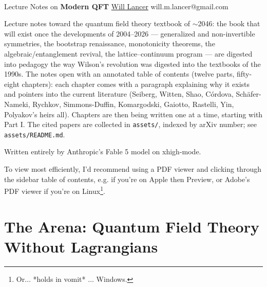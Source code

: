 \documentclass[11pt]{article}
\numberwithin{equation}{section}
\renewcommand{\theHsection}{part.\arabic{part}.section.\arabic{section}}
\renewcommand{\theHequation}{\theHsection.equation.\arabic{equation}}
\theoremstyle{definition}
\begin{document}
\thispagestyle{empty}
\bigskip \
\vspace{0.1cm}

\begin{center}
{\fontsize{22}{22} \selectfont Lecture Notes on}
\vskip 16pt
{\fontsize{36}{36} \selectfont \bf \sffamily Modern QFT}
\vskip 24pt
{\fontsize{18}{18} \selectfont \rmfamily \href{https://will-lancer.github.io}{Will Lancer}}
\vskip 6pt
{\fontsize{14}{14} \selectfont \ttfamily will.m.lancer@gmail.com}
\vskip 24pt
\end{center}

{\parindent0pt \baselineskip=15.5pt}
\noin
Lecture notes toward the quantum field theory textbook of $\sim$2046: the book 
that will exist once the developments of 2004--2026 --- generalized and 
non-invertible symmetries, the bootstrap renaissance, monotonicity theorems, the 
algebraic/entanglement revival, the lattice--continuum program --- are digested 
into pedagogy the way Wilson's revolution was digested into the textbooks of the 
1990s. The notes open with an annotated table of contents (twelve parts,
fifty-eight chapters): each chapter comes with a paragraph explaining why it
exists and pointers into the current literature (Seiberg, Witten, Shao, 
C\'ordova, Sch\"afer-Nameki, Rychkov, Simmons-Duffin, Komargodski, Gaiotto, 
Rastelli, Yin, Polyakov's heirs all). Chapters are then being written one at a 
time, starting with Part I. The cited papers are collected in \texttt{assets/}, 
indexed by arXiv number; see \texttt{assets/README.md}.\\

\begin{center}
    Written entirely by Anthropic's Fable 5 model on xhigh-mode.
\end{center}

To view most efficiently, I'd recommend using a PDF viewer and clicking
through the sidebar table of contents, e.g. if you're on Apple then
Preview, or Adobe's PDF viewer if you're on Linux\footnote{Or$\ldots$ *holds in vomit* $\ldots$ Windows.}.
\newpage
\microtoc
\newpage



\newpage

\part{The Arena: Quantum Field Theory Without Lagrangians}


\newpage


\clearpage
\appendix
\renewcommand{\theHsection}{appendix.section.\arabic{section}}
\renewcommand{\theHequation}{\theHsection.equation.\arabic{equation}}

\end{document}
